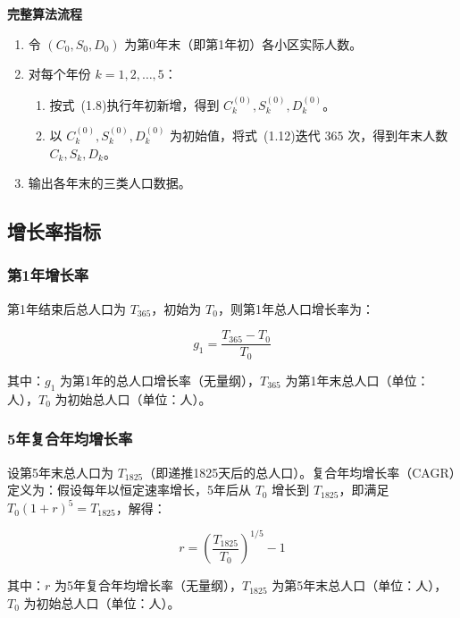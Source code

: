 \documentclass[12pt,a4paper]{article}
\begin{document}
\noindent\textbf{完整算法流程}

\begin{enumerate}
    \item 令 $(C_0, S_0, D_0)$ 为第0年末（即第1年初）各小区实际人数。
    \item 对每个年份 $k = 1, 2, \dots, 5$：
    \begin{enumerate}
        \item 按式~(1.8)执行年初新增，得到 $C_k^{(0)}, S_k^{(0)}, D_k^{(0)}$。
        \item 以 $C_k^{(0)}, S_k^{(0)}, D_k^{(0)}$ 为初始值，将式~(1.12)迭代 $365$ 次，得到年末人数 $C_k, S_k, D_k$。
    \end{enumerate}
    \item 输出各年末的三类人口数据。
\end{enumerate}

\subsection{增长率指标}

\subsubsection{第1年增长率}

第1年结束后总人口为 $T_{365}$，初始为 $T_0$，则第1年总人口增长率为：

\begin{equation}
g_1 = \frac{T_{365} - T_0}{T_0}
\tag{1.14}
\end{equation}

其中：$g_1$ 为第1年的总人口增长率（无量纲），$T_{365}$ 为第1年末总人口（单位：人），$T_0$ 为初始总人口（单位：人）。

\subsubsection{5年复合年均增长率}

设第5年末总人口为 $T_{1825}$（即递推1825天后的总人口）。复合年均增长率（CAGR）定义为：假设每年以恒定速率增长，5年后从 $T_0$ 增长到 $T_{1825}$，即满足 $T_0(1+r)^5 = T_{1825}$，解得：

\begin{equation}
r = \left(\frac{T_{1825}}{T_0}\right)^{1/5} - 1
\tag{1.15}
\end{equation}

其中：$r$ 为5年复合年均增长率（无量纲），$T_{1825}$ 为第5年末总人口（单位：人），$T_0$ 为初始总人口（单位：人）。
\end{document}
